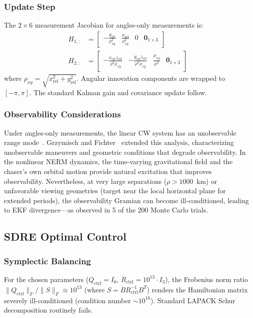 \documentclass[preprint,3p,times]{elsarticle}
\begin{document}
\subsubsection{Update Step}
The $2 \times 6$ measurement Jacobian for angles-only measurements is:
\begin{align}
H_{1,:} &= \begin{bmatrix} -\frac{y_{\text{rel}}}{\rho_{xy}^2} & \frac{x_{\text{rel}}}{\rho_{xy}^2} & 0 & \mathbf{0}_{1\times 3} \end{bmatrix} \\
H_{2,:} &= \begin{bmatrix} -\frac{x_{\text{rel}} z_{\text{rel}}}{\rho^2 \rho_{xy}} & -\frac{y_{\text{rel}} z_{\text{rel}}}{\rho^2 \rho_{xy}} & \frac{\rho_{xy}}{\rho^2} & \mathbf{0}_{1\times 3} \end{bmatrix}
\end{align}
where $\rho_{xy} = \sqrt{x_{\text{rel}}^2 + y_{\text{rel}}^2}$. Angular innovation components are wrapped to $[-\pi, \pi]$. The standard Kalman gain and covariance update follow.

\subsubsection{Observability Considerations}
Under angles-only measurements, the linear CW system has an unobservable range mode~\cite{Woffinden2009}. Grzymisch and Fichter~\cite{Grzymisch2014} extended this analysis, characterizing unobservable maneuvers and geometric conditions that degrade observability. In the nonlinear NERM dynamics, the time-varying gravitational field and the chaser's own orbital motion provide natural excitation that improves observability. Nevertheless, at very large separations ($\rho > 1000$~km) or unfavorable viewing geometries (target near the local horizontal plane for extended periods), the observability Gramian can become ill-conditioned, leading to EKF divergence---as observed in 5 of the 200 Monte Carlo trials.

\subsection{SDRE Optimal Control}

\subsubsection{Symplectic Balancing}
For the chosen parameters ($Q_{\text{ctrl}} = I_6$, $R_{\text{ctrl}} = 10^{13} \cdot I_3$), the Frobenius norm ratio $\|Q_{\text{ctrl}}\|_F / \|S\|_F \approx 10^{13}$ (where $S = B R_{\text{ctrl}}^{-1} B^T$) renders the Hamiltonian matrix severely ill-conditioned (condition number ${\sim}10^{18}$). Standard LAPACK Schur decomposition routinely fails.
\end{document}
